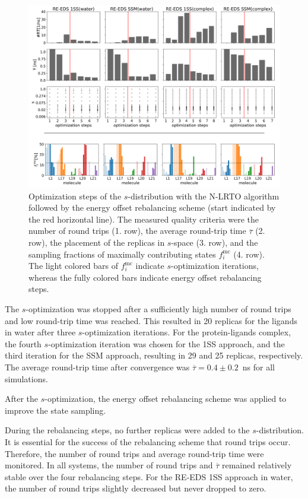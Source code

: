 \begin{figure}[h]
\centering
\includegraphics[width=\textwidth]{fig/results/ringOpening/paramOptimization/S-optimization_ringOpening.png}
\caption{Optimization steps of the $s$-distribution with the N-LRTO \cite{Sidler2017} algorithm followed by the energy offset rebalancing scheme (start indicated by the red horizontal line). The measured quality criteria were the number of round trips (1. row), the average round-trip time $\overline{\tau}$ (2. row), the placement of the replicas in $s$-space (3. row), and the sampling fractions of maximally contributing states $f_{i}^{\text{mc}}$ (4. row). The light colored bars of $f_{i}^{\text{mc}}$ indicate $s$-optimization iterations, whereas the fully colored bars indicate energy offset rebalancing steps. }
\label{fig: CHK1_RingOpening_sOptimization}
\end{figure}


The $s$-optimization was stopped after a sufficiently high number of round trips and low round-trip time was reached. 
This resulted in 20 replicas for the ligands in water after three $s$-optimization iterations.
For the protein-ligands complex, the fourth $s$-optimization iteration was chosen for the 1SS approach, and the third iteration for the SSM approach, resulting in 29 and 25 replicas, respectively. 
The average round-trip time after convergence was $\overline{\tau} = 0.4 \pm 0.2$~ns for all simulations.

After the $s$-optimization, the energy offset rebalancing scheme was applied to improve the state sampling. 

During the rebalancing steps, no further replicas were added to the $s$-distribution. It is essential for the success of the rebalancing scheme that round trips occur. Therefore, the number of round trips and average round-trip time were monitored. In all systems, the number of round trips and $\overline{\tau}$ remained relatively stable over the four rebalancing steps. For the RE-EDS 1SS approach in water, the number of round trips slightly decreased but never dropped to zero.

